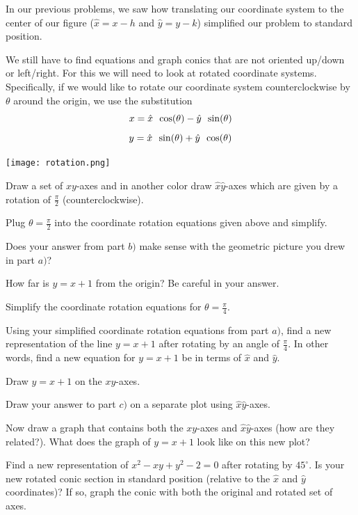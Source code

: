 \begin{info} In our previous problems, we saw how translating our coordinate system to the center of our figure ($\hat{x}=x-h$ and $\hat{y}=y-k$) simplified our problem to standard position.

We still have to find equations and graph conics that are not oriented up/down or left/right. For this we will need to look at rotated coordinate systems. Specifically, if we would like to rotate our coordinate system counterclockwise by $\theta$ around the origin, we use the substitution
$$x=\hat{x} \enskip \cos(\theta) - \hat{y} \enskip \sin(\theta) $$ $$y=\hat{x} \enskip \sin(\theta) + \hat{y} \enskip \cos(\theta)$$

\begin{center} \texttt{[image: rotation.png]} \end{center}
\end{info}
\bq \be
\item Draw a set of $xy$-axes and in another color draw $\hat{x}\hat{y}$-axes which are given by a rotation of $\frac{\pi}{2}$ (counterclockwise).
\item Plug $\theta = \frac{\pi}{2}$ into the coordinate rotation equations given above and simplify.
\item Does your answer from part $b)$ make sense with the geometric picture you drew in part $a)$?
\ee \eq

\bq
\be
\item How far is $y=x+1$ from the origin? Be careful in your answer.
\item Simplify the coordinate rotation equations for $\theta =\frac{\pi}{4}$.
\item Using your simplified coordinate rotation equations from part $a)$, find a new representation of the line $y=x+1$ after rotating by an angle of $\frac{\pi}{4}$. In other words, find a new equation for $y=x+1$ be in terms of $\hat{x}$ and $\hat{y}$.
\item Draw $y=x+1$ on the $xy$-axes.
\item Draw your answer to part $c)$ on a separate plot using $\hat{x}\hat{y}$-axes.
\item Now draw a graph that contains both the $xy$-axes and $\hat{x}\hat{y}$-axes (how are they related?). What does the graph of $y=x+1$ look like on this new plot?
\ee
\eq

\question Find a new representation of $x^2-xy+y^2-2=0$ after rotating by $45^{\circ}$. Is your new rotated conic section in standard position (relative to the $\widehat{x}$ and $\widehat{y}$ coordinates)? If so, graph the conic with both the original and rotated set of axes.

